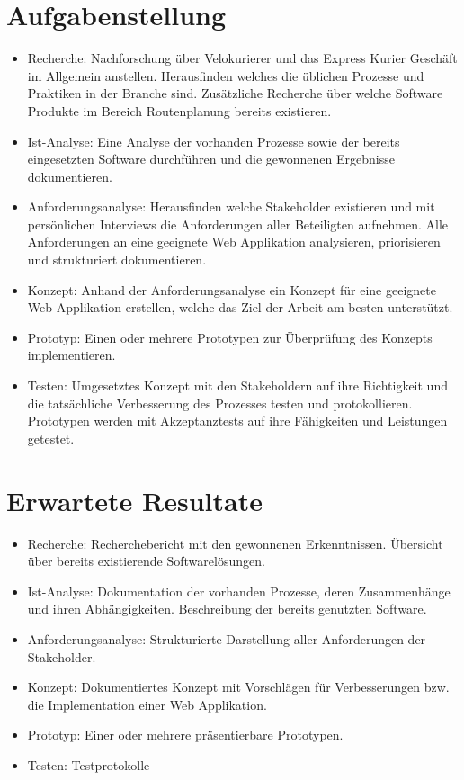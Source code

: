 \section{Aufgabenstellung}
\label{sec:aufgabenstellung}
\begin{itemize}
  \item Recherche: Nachforschung über Velokurierer und das Express Kurier Geschäft im Allgemein anstellen. Herausfinden welches die üblichen Prozesse und Praktiken in der Branche sind. Zusätzliche Recherche über welche Software Produkte im Bereich Routenplanung bereits existieren.
  \item Ist-Analyse: Eine Analyse der vorhanden Prozesse sowie der bereits eingesetzten Software durchführen und die gewonnenen Ergebnisse dokumentieren.
  \item Anforderungsanalyse: Herausfinden welche Stakeholder existieren und mit persönlichen Interviews die Anforderungen aller Beteiligten aufnehmen. Alle Anforderungen an eine geeignete Web Applikation analysieren, priorisieren und strukturiert dokumentieren.
  \item Konzept: Anhand der Anforderungsanalyse ein Konzept für eine geeignete Web Applikation erstellen, welche das Ziel der Arbeit am besten unterstützt.
  \item Prototyp: Einen oder mehrere Prototypen zur Überprüfung des Konzepts implementieren.
  \item Testen: Umgesetztes Konzept mit den Stakeholdern auf ihre Richtigkeit und die tatsächliche Verbesserung des Prozesses testen und protokollieren. Prototypen werden mit Akzeptanztests auf ihre Fähigkeiten und Leistungen getestet.
\end{itemize}


\section{Erwartete Resultate}
\label{sec:erwarteteresultate}
\begin{itemize}
  \item Recherche: Recherchebericht mit den gewonnenen Erkenntnissen. Übersicht über bereits existierende Softwarelösungen.
  \item Ist-Analyse: Dokumentation der vorhanden Prozesse, deren Zusammenhänge und ihren Abhängigkeiten. Beschreibung der bereits genutzten Software.
  \item Anforderungsanalyse: Strukturierte Darstellung aller Anforderungen der Stakeholder.
  \item Konzept: Dokumentiertes Konzept mit Vorschlägen für Verbesserungen bzw. die Implementation einer Web Applikation.
  \item Prototyp: Einer oder mehrere präsentierbare Prototypen.
  \item Testen: Testprotokolle
\end{itemize}
